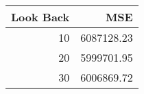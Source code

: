 \begin{tabular}{rr}
    \toprule
    Look Back & MSE \\
    \midrule
    10 & 6087128.23 \\
    20 & 5999701.95 \\
    30 & 6006869.72 \\
    \bottomrule
\end{tabular}
